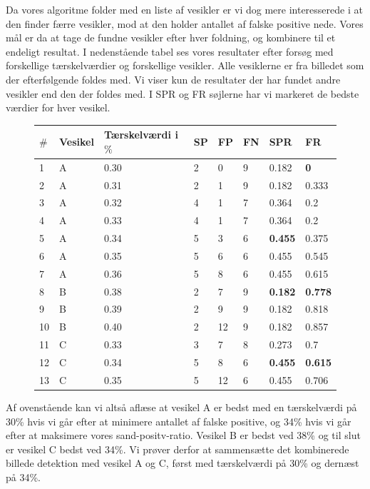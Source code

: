 Da vores algoritme folder med en liste af vesikler er vi dog mere interesserede i at den finder færre vesikler, mod at den holder antallet af falske positive nede. Vores mål er da at tage de fundne vesikler efter hver foldning, og kombinere til et endeligt resultat. I nedenstående tabel ses vores resultater efter forsøg med forskellige tærskelværdier og forskellige  vesikler. Alle vesiklerne er fra billedet som der efterfølgende foldes med. Vi viser kun de resultater der har fundet andre vesikler end den der foldes med. I SPR og FR søjlerne har vi markeret de bedste værdier for hver vesikel.
\begin{figure}[H]
	\centering
\begin{tabular}{l|l|l|l|l|l|l|l}
	$\#$ & Vesikel & Tærskelværdi i $\%$ & SP & FP & FN & SPR & FR \\\hline
	1	&	A	&	0.30	& 2		& 0		&9 	&0.182 			&\textbf{0}\\\hline
	2	&	A	&	0.31	& 2		& 1		&9 	&0.182 			&0.333\\\hline
	3	&	A	&	0.32	& 4		& 1		&7  &0.364 			&0.2\\\hline
	4	&	A	&	0.33	& 4		& 1		&7  &0.364 			&0.2\\\hline
	5	&	A	&	0.34	& 5		& 3		&6  &\textbf{0.455}	&0.375\\\hline
	6	&	A	&	0.35	& 5		& 6		&6  &0.455 			&0.545\\\hline
	7	&	A	&	0.36	& 5		& 8		&6  &0.455			&0.615\\\hline	
	8	&	B	&	0.38	& 2		& 7		&9 	&\textbf{0.182}	&\textbf{0.778}\\\hline
	9	&	B	&	0.39	& 2		& 9		&9 	&0.182 			&0.818\\\hline
	10	&	B	&	0.40	& 2		& 12	&9 	&0.182 			&0.857\\\hline	
	11	&	C	&	0.33	& 3		& 7		&8 	&0.273 			&0.7\\\hline
	12	&	C	&	0.34	& 5		& 8		&6 	&\textbf{0.455}	&\textbf{0.615}\\\hline
	13	&	C	&	0.35	& 5		& 12	&6 	&0.455 			&0.706
\end{tabular} 
\end{figure}

Af ovenstående kan vi altså aflæse at vesikel A er bedst med en tærskelværdi på 30\% hvis vi går efter at minimere antallet af falske positive, og 34\% hvis vi går efter at maksimere vores sand-positv-ratio. Vesikel B er bedst ved 38\% og til slut er vesikel C bedst ved 34\%. Vi prøver derfor at sammensætte det kombinerede billede detektion med vesikel A og C, først med tærskelværdi på 30\% og dernæst på 34\%. 

